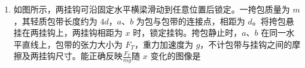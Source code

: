 \documentclass[\gkver]{gaokaozhenti}
\begin{document}
\begin{enumerate}
{故 A 错误；

$ T=\frac{1}{f}=0.5 \Us $

B．波从 $S$ 传到 $P$ 需 $t_{P}=\frac{2}{4}\Us=0.5\Us$。在 $t=0.125\Us$ 时，$P$ 尚未起振，仍在平衡位置，故 B 错误；

C．根据几何关系可知 $ Q $ 距离波源 $ S $ 有 $ 5 \Um $，则该波传播到 $ P $、$ Q $ 的时间差为 $ \frac{5-2}{v}=\frac{3}{4} \Us=0.75 \Us $

故 C 正确；

D．$ P $、$ Q $ 所在的波面相距 $ 3 \Um $，为 $ \frac{3}{2}\lambda $，则 $ t = 1.25 \Us $ 以后，$ P $、$ Q $ 的位移始终相反，故 D 错误。

故选 C。
}
\item
如图所示，两挂钩可沿固定水平横梁滑动到任意位置后锁定。一挎包质量为 $ m $，其轻质包带长度约为 $ 4 d $，$ a $、$ b $ 为包与包带的连接点，相距为 $ d $。将挎包悬挂在两挂钩上，两挂钩相距为 $ x $ 时，锁定挂钩。挎包静止时，$ a $、$ b $ 在同一水平直线上，包带的张力大小为 $ F_{T} $，重力加速度为 $ g $，不计包带与挂钩之间的摩擦及两挂钩尺寸。能正确反映$ \frac{{{F_{T}}}}{{mg}} $随 $ x $ 变化的图像是 

\onepicture[w=9.23cm, h=4.90cm]{}
\fourchoices[answer=D,ispicture=true,h=2.74cm]
{}
{}
{}
{}




\end{enumerate}
\end{document}
